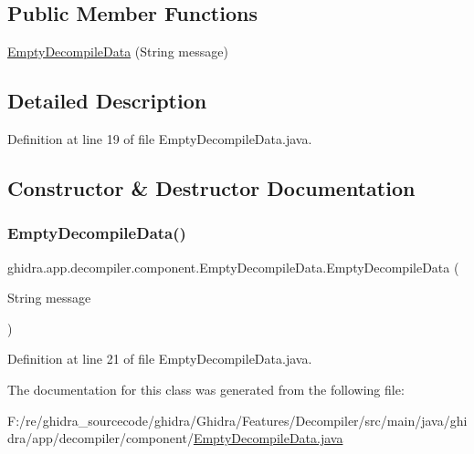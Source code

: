 \subsection*{Public Member Functions}
\begin{DoxyCompactItemize}
\item 
\mbox{\hyperlink{classghidra_1_1app_1_1decompiler_1_1component_1_1_empty_decompile_data_a8ebac496e09aa69f9ca19d222bc9c35a}{Empty\+Decompile\+Data}} (String message)
\end{DoxyCompactItemize}


\subsection{Detailed Description}


Definition at line 19 of file Empty\+Decompile\+Data.\+java.



\subsection{Constructor \& Destructor Documentation}
\mbox{\label{classghidra_1_1app_1_1decompiler_1_1component_1_1_empty_decompile_data_a8ebac496e09aa69f9ca19d222bc9c35a}} 
\subsubsection{\texorpdfstring{EmptyDecompileData()}{EmptyDecompileData()}}
{\footnotesize\ttfamily ghidra.\+app.\+decompiler.\+component.\+Empty\+Decompile\+Data.\+Empty\+Decompile\+Data (\begin{DoxyParamCaption}\item[{String}]{message }\end{DoxyParamCaption})\hspace{0.3cm}{\ttfamily [inline]}}



Definition at line 21 of file Empty\+Decompile\+Data.\+java.



The documentation for this class was generated from the following file\+:\begin{DoxyCompactItemize}
\item 
F\+:/re/ghidra\+\_\+sourcecode/ghidra/\+Ghidra/\+Features/\+Decompiler/src/main/java/ghidra/app/decompiler/component/\mbox{\hyperlink{_empty_decompile_data_8java}{Empty\+Decompile\+Data.\+java}}\end{DoxyCompactItemize}
